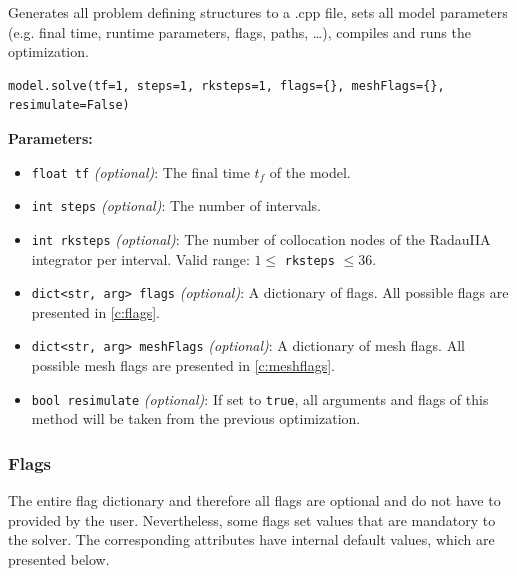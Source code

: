 \documentclass[12pt]{article}
\begin{document}
\begin{mdframed}[backgroundcolor=gray!10, roundcorner=10pt,
		linewidth=1pt]

	Generates all problem defining structures to a .cpp file,
	sets all model parameters (e.g. final time, runtime parameters, flags,
	paths, \ldots), compiles and runs the optimization.

	\begin{lstlisting}
model.solve(tf=1, steps=1, rksteps=1, flags={}, meshFlags={}, resimulate=False)
	\end{lstlisting}
	\label{solve}
	\textbf{Parameters:}
	\begin{itemize}
		\item \texttt{float tf} \emph{(optional)}: The final time $t_f$
		      of the model.
		\item \texttt{int steps} \emph{(optional)}: The number of
		      intervals.
		\item \texttt{int rksteps} \emph{(optional)}: The number of
		      collocation nodes of the RadauIIA integrator per interval. Valid range: $1
			      \leq$ \texttt{rksteps} $\leq 36$.
		\item \texttt{dict<str, arg> flags} \emph{(optional)}: A
		      dictionary of flags. All possible flags are presented in \eqref{c:flags}.
		\item \texttt{dict<str, arg> meshFlags} \emph{(optional)}: A
		      dictionary of mesh flags. All possible mesh flags are presented in
		      \eqref{c:meshflags}.
		\item \texttt{bool resimulate} \emph{(optional)}: If set to
		      \texttt{true}, all arguments and flags of this method will be taken from the
		      previous optimization.
	\end{itemize}

\end{mdframed}

\subsubsection{Flags}
\label{c:flags}

The entire flag dictionary and therefore all flags are optional and do not have
to provided by the user. Nevertheless, some flags set values that are mandatory
to the solver. The corresponding attributes have internal default values, which
are presented below.
\end{document}
